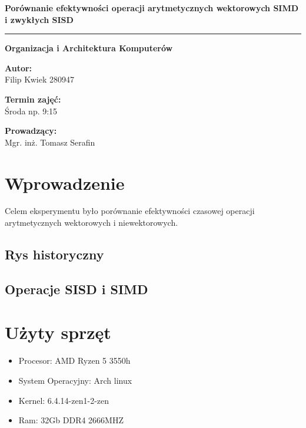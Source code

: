 \documentclass{article}
\begin{document}
\vspace{75pt}

\begin{center}
    \textbf{\large Porównanie efektywności operacji arytmetycznych wektorowych SIMD i zwykłych SISD} 
    \vspace{2pt}
    \hrule
    \vspace{4pt}
    \textbf{\large Organizacja i Architektura Komputerów} 
\end{center}

\vspace{75pt}

\begin{center}
    \textbf{Autor: } \\
    Filip Kwiek 280947
\end{center}

\begin{center}
    \textbf{Termin zajęć: } \\
    Środa np. 9:15
\end{center}

\begin{center}
    \textbf{Prowadzący: } \\
    Mgr. inż. Tomasz Serafin
\end{center}

\newpage
\tableofcontents
\newpage

\section{Wprowadzenie}

Celem eksperymentu było porównanie efektywności czasowej operacji arytmetycznych wektorowych i niewektorowych.

\subsection{Rys historyczny}

\subsection{Operacje SISD i SIMD}

\section{Użyty sprzęt}

\begin{itemize}
    \item Procesor: AMD Ryzen 5 3550h
    \item System Operacyjny: Arch linux
    \item Kernel: 6.4.14-zen1-2-zen
    \item Ram: 32Gb DDR4 2666MHZ 
\end{itemize}
\end{document}
